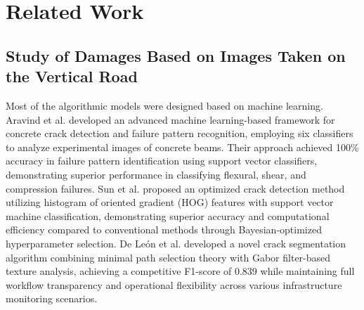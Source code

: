 \documentclass[sensors,article,submit,moreauthors]{Definitions/mdpi}
\begin{document}

%    


    \section{Related Work}

    \subsection{Study of Damages Based on Images Taken on the Vertical Road}

    Most of the algorithmic models were designed based on machine learning. Aravind et al.\citep{aravind2021machine} developed an advanced machine learning-based framework for concrete crack detection and failure pattern recognition, employing six classifiers to analyze experimental images of concrete beams. Their approach achieved 100\% accuracy in failure pattern identification using support vector classifiers, demonstrating superior performance in classifying flexural, shear, and compression failures. Sun et al.\citep{sun2023employing} proposed an optimized crack detection method utilizing histogram of oriented gradient (HOG) features with support vector machine classification, demonstrating superior accuracy and computational efficiency compared to conventional methods through Bayesian-optimized hyperparameter selection. De León et al.\citep{deleon2023new} developed a novel crack segmentation algorithm combining minimal path selection theory with Gabor filter-based texture analysis, achieving a competitive F1-score of 0.839 while maintaining full workflow transparency and operational flexibility across various infrastructure monitoring scenarios.
\end{document}
